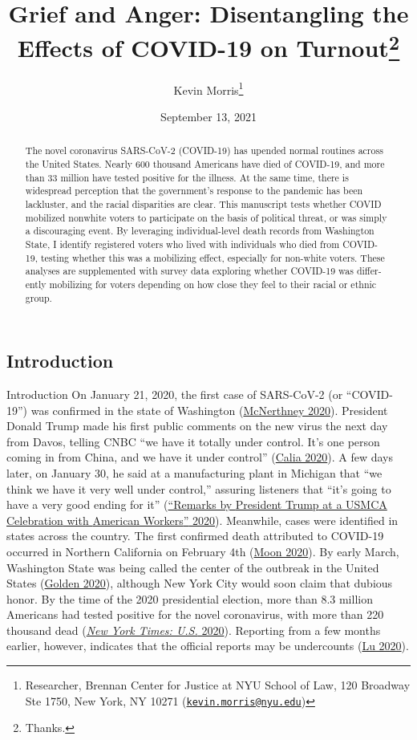 \documentclass[
  12pt,
]{article}
\title{Grief and Anger: Disentangling the Effects of COVID-19 on Turnout\thanks{Thanks.}}
\author{Kevin Morris\footnote{Researcher, Brennan Center for Justice at NYU School of Law, 120 Broadway Ste 1750, New York, NY 10271 (\href{mailto:kevin.morris@nyu.edu}{\nolinkurl{kevin.morris@nyu.edu}})}}
\date{September 13, 2021}
\begin{document}
\maketitle
\begin{abstract}
The novel coronavirus SARS-CoV-2 (COVID-19) has upended normal routines across the United States. Nearly 600 thousand Americans have died of COVID-19, and more than 33 million have tested positive for the illness. At the same time, there is widespread perception that the government's response to the pandemic has been lackluster, and the racial disparities are clear. This manuscript tests whether COVID mobilized nonwhite voters to participate on the basis of political threat, or was simply a discouraging event. By leveraging individual-level death records from Washington State, I identify registered voters who lived with individuals who died from COVID- 19, testing whether this was a mobilizing effect, especially for non-white voters. These analyses are supplemented with survey data exploring whether COVID-19 was differ- ently mobilizing for voters depending on how close they feel to their racial or ethnic group.
\end{abstract}

\pagebreak

\doublespacing

\hypertarget{introduction}{%
\subsection*{Introduction}\label{introduction}}

Introduction
On January 21, 2020, the first case of SARS-CoV-2 (or ``COVID-19'') was confirmed in the state of Washington (\protect\hyperlink{ref-McNerthney2020}{McNerthney 2020}). President Donald Trump made his first public comments on the new virus the next day from Davos, telling CNBC ``we have it totally under control. It's one person coming in from China, and we have it under control'' (\protect\hyperlink{ref-Calia2020}{Calia 2020}). A few days later, on January 30, he said at a manufacturing plant in Michigan that ``we think we have it very well under control,'' assuring listeners that ``it's going to have a very good ending for it'' (\protect\hyperlink{ref-whitehouse2020}{{``Remarks by {President Trump} at a {USMCA Celebration} with {American Workers}''} 2020}). Meanwhile, cases were identified in states across the country. The first confirmed death attributed to COVID-19 occurred in Northern California on February 4th (\protect\hyperlink{ref-Moon2020}{Moon 2020}). By early March, Washington State was being called the center of the outbreak in the United States (\protect\hyperlink{ref-Golden2020}{Golden 2020}), although New York City would soon claim that dubious honor. By the time of the 2020 presidential election, more than 8.3 million Americans had tested positive for the novel coronavirus, with more than 220 thousand dead (\protect\hyperlink{ref-nyt2020}{\emph{New York Times: U.S.} 2020}). Reporting from a few months earlier, however, indicates that the official reports may be undercounts (\protect\hyperlink{ref-Lu2020}{Lu 2020}).
\end{document}

